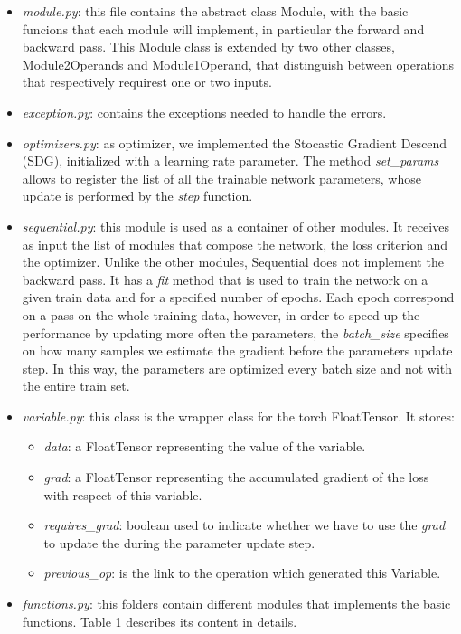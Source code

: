 \documentclass[10pt,conference,compsocconf]{IEEEtran}
\begin{document}
\begin{itemize}
	\item \textit{module.py}: this file contains the abstract class Module, with the basic funcions that each module will implement, in particular the forward and backward pass. This Module class is extended by two other classes, Module2Operands and Module1Operand, that distinguish between operations that respectively requirest one or two inputs. 
	
	\item \textit{exception.py}: contains the exceptions needed to handle the errors.
	
	\item \textit{optimizers.py}: as optimizer, we implemented the Stocastic Gradient Descend (SDG), initialized with a learning rate parameter. The method \textit{set\_params} allows to register the list of all the trainable network parameters, whose update is performed by the \textit{step} function.
	
	\item \textit{sequential.py}: this module is used as a container of other modules. It receives as input the list of modules that compose the network, the loss criterion and the optimizer. Unlike the other modules, Sequential does not implement the backward pass. It has a \textit{fit} method that is used to train the network on a given train data and for a specified number of epochs. Each epoch correspond on a pass on the whole training data, however, in order to speed up the performance by updating more often the parameters, the \textit{batch\_size} specifies on how many samples we estimate the gradient before the parameters update step. In this way, the parameters are optimized every batch size and not with the entire train set.
	
	\item \textit{variable.py}: this class is the wrapper class for the torch FloatTensor. It stores:
	\begin{itemize}
        \item \textit{data}: a FloatTensor representing the value of the variable.
		\item \textit{grad}: a FloatTensor representing the accumulated gradient of the loss with respect of this variable.
		\item \textit{requires\_grad}: boolean used to indicate whether we have to use the \textit{grad} to update the  during the parameter update step.
		\item \textit{previous\_op}: is the link to the operation which generated this Variable.
	\end{itemize}
	
	\item \textit{functions.py}: this folders contain different modules that implements the basic functions. Table 1  describes its content in details.
\end{itemize}
\end{document}
